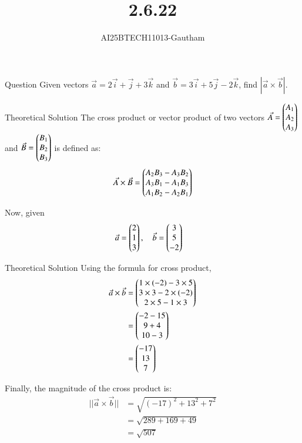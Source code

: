 \documentclass{beamer}
\title %
{2.6.22}
\author %
{AI25BTECH11013-Gautham}
\begin{document}
\frame{\titlepage}
\begin{frame}{Question}
Given vectors $\Vec{a} = 2\overrightarrow{i} + \overrightarrow{j} + 3\overrightarrow{k}$ and $\Vec{b} = 3\overrightarrow{i} + 5\overrightarrow{j} - 2\overrightarrow{k}$, find $|\Vec{a} \times \Vec{b}|$.\\
\end{frame}

\begin{frame}{Theoretical Solution}
The cross product or vector product of two vectors $\Vec{A} = \begin{pmatrix}A_{1} \\ A_{2} \\ A_{3}\end{pmatrix}$ and $\Vec{B} = \begin{pmatrix}B_{1} \\ B_{2} \\ B_{3}\end{pmatrix}$ is defined as:
\begin{align}
\Vec{A} \times \Vec{B} = \begin{pmatrix}
A_{2} B_{3} - A_{3} B_{2}\\
A_{3} B_{1} - A_{1} B_{3} \\
A_{1} B_{2} - A_{2} B_{1}
\end{pmatrix}
\end{align}

Now, given
\begin{align}
\Vec{a} &= \begin{pmatrix}2 \\ 1 \\ 3\end{pmatrix}, \quad
\Vec{b} = \begin{pmatrix}3 \\ 5 \\ -2\end{pmatrix}
\end{align}
\end{frame}

\begin{frame}{Theoretical Solution}
Using the formula for cross product,
\begin{align}
\Vec{a} \times \Vec{b} &= \begin{pmatrix}
1 \times (-2) - 3 \times 5 \\
3 \times 3 - 2 \times (-2) \\
2 \times 5 - 1 \times 3
\end{pmatrix} \\
&= \begin{pmatrix}
-2 - 15 \\
9 + 4 \\
10 - 3
\end{pmatrix} \\
&= \begin{pmatrix}-17 \\ 13 \\ 7\end{pmatrix}
\end{align}

Finally, the magnitude of the cross product is:
\begin{align}
||\Vec{a} \times \Vec{b}||&= \sqrt{(-17)^2 + 13^2 + 7^2} \\
&= \sqrt{289 + 169 + 49} \\
&= \sqrt{507}
\end{align}
\end{frame}
\end{document}
